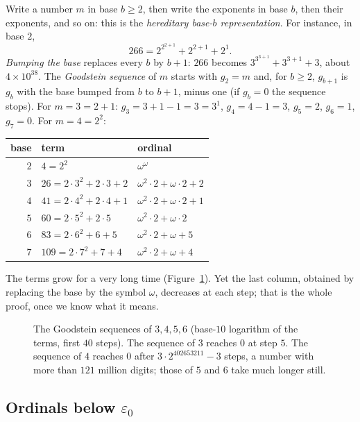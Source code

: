 Write a number $m$ in base $b\ge2$, then write the exponents in base $b$, then their exponents, and so on: this is the \emph{hereditary base-$b$ representation}. For instance, in base $2$,
\[
266=2^{2^{2+1}}+2^{2+1}+2^{1}.
\]
\emph{Bumping the base} replaces every $b$ by $b+1$: $266$ becomes $3^{3^{3+1}}+3^{3+1}+3$, about $4\times10^{38}$. The \emph{Goodstein sequence} of $m$ starts with $g_2=m$ and, for $b\ge2$, $g_{b+1}$ is $g_b$ with the base bumped from $b$ to $b+1$, minus one (if $g_b=0$ the sequence stops). For $m=3=2+1$: $g_3=3+1-1=3=3^1$, $g_4=4-1=3$, $g_5=2$, $g_6=1$, $g_7=0$. For $m=4=2^2$:
\begin{center}
\begin{tabular}{rll}
base & term & ordinal\\\hline
$2$ & $4=2^2$ & $\omega^\omega$\\
$3$ & $26=2\cdot3^2+2\cdot3+2$ & $\omega^2\cdot2+\omega\cdot2+2$\\
$4$ & $41=2\cdot4^2+2\cdot4+1$ & $\omega^2\cdot2+\omega\cdot2+1$\\
$5$ & $60=2\cdot5^2+2\cdot5$ & $\omega^2\cdot2+\omega\cdot2$\\
$6$ & $83=2\cdot6^2+6+5$ & $\omega^2\cdot2+\omega+5$\\
$7$ & $109=2\cdot7^2+7+4$ & $\omega^2\cdot2+\omega+4$
\end{tabular}
\end{center}
The terms grow for a very long time (Figure~\ref{fig:goodstein}). Yet the last column, obtained by replacing the base by the symbol $\omega$, decreases at each step; that is the whole proof, once we know what it means.

\begin{figure}[ht]
\centering
{}
\caption{The Goodstein sequences of $3,4,5,6$ (base-$10$ logarithm of the terms, first $40$ steps). The sequence of $3$ reaches $0$ at step $5$. The sequence of $4$ reaches $0$ after $3\cdot2^{402653211}-3$ steps, a number with more than $121$ million digits; those of $5$ and $6$ take much longer still.}
\label{fig:goodstein}
\end{figure}

\subsection*{Ordinals below \texorpdfstring{$\varepsilon_0$}{epsilon 0}}

